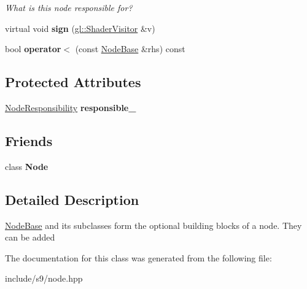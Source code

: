 \begin{DoxyCompactItemize}
\begin{DoxyCompactList}\small\item\em What is this node responsible for? \end{DoxyCompactList}\item 
\hypertarget{classs9_1_1NodeBase_af30183b2504334380f3672130451e8c1}{virtual void {\bfseries sign} (\hyperlink{classs9_1_1gl_1_1ShaderVisitor}{gl\-::\-Shader\-Visitor} \&v)}\label{classs9_1_1NodeBase_af30183b2504334380f3672130451e8c1}

\item 
\hypertarget{classs9_1_1NodeBase_a1e601e33c84360285cb05974d61d1199}{bool {\bfseries operator$<$} (const \hyperlink{classs9_1_1NodeBase}{Node\-Base} \&rhs) const }\label{classs9_1_1NodeBase_a1e601e33c84360285cb05974d61d1199}

\end{DoxyCompactItemize}
\subsection*{Protected Attributes}
\begin{DoxyCompactItemize}
\item 
\hypertarget{classs9_1_1NodeBase_a27468fd779a60bfcd36c4532bcec8a78}{\hyperlink{namespaces9_a5c291cd938e865ef990a7f53eec62f36}{Node\-Responsibility} {\bfseries responsible\-\_\-}}\label{classs9_1_1NodeBase_a27468fd779a60bfcd36c4532bcec8a78}

\end{DoxyCompactItemize}
\subsection*{Friends}
\begin{DoxyCompactItemize}
\item 
\hypertarget{classs9_1_1NodeBase_a6db9d28bd448a131448276ee03de1e6d}{class {\bfseries Node}}\label{classs9_1_1NodeBase_a6db9d28bd448a131448276ee03de1e6d}

\end{DoxyCompactItemize}


\subsection{Detailed Description}
\hyperlink{classs9_1_1NodeBase}{Node\-Base} and its subclasses form the optional building blocks of a node. They can be added 

The documentation for this class was generated from the following file\-:\begin{DoxyCompactItemize}
\item 
include/s9/node.\-hpp\end{DoxyCompactItemize}
